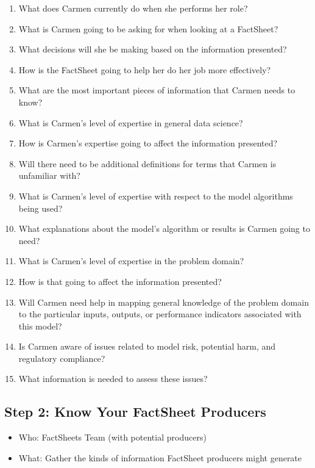 \documentclass[11pt,dvipdfm]{article}
\begin{document}
\begin{enumerate}
\item What does Carmen currently do when she performs her role?
\item What is Carmen going to be asking for when looking at a FactSheet?
\item What decisions will she be making based on the information presented?
\item How is the FactSheet going to help her do her job more effectively?
\item What are the most important pieces of information that Carmen needs to know?
\item What is Carmen's level of expertise in general data science?
\item How is Carmen's expertise going to affect the information presented?
\item Will there need to be additional definitions for terms that Carmen is unfamiliar with?
\item What is Carmen's level of expertise with respect to the model algorithms being used?
\item What explanations about the model's algorithm or results is Carmen going to need?
\item What is Carmen's level of expertise in the problem domain?
\item How is that going to affect the information presented?
\item Will Carmen need help in mapping general knowledge of the problem domain to the particular inputs, outputs, or performance indicators associated with this model?
\item Is Carmen aware of issues related to model risk, potential harm, and regulatory compliance?
\item What information is needed to assess these issues?
\end{enumerate}
\hspace{.2cm}

\subsection{Step 2: Know Your FactSheet Producers}

\begin{itemize}[noitemsep,nolistsep]
    \item Who: FactSheets Team (with potential producers)
    \item What: Gather the kinds of information FactSheet producers might generate
\end{itemize}
\hspace{.2cm}
\end{document}

